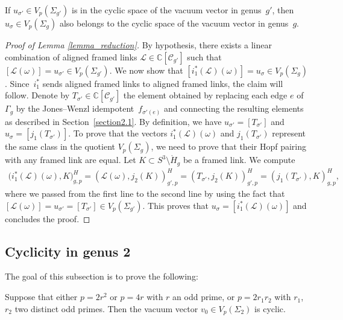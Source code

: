 \begin{Lemma}\label{lemma_reduction}If $u_{\sigma'}\in V_p(\Sigma_{g'})$ is in the cyclic space of the vacuum vector in genus~$g'$, then $u_{\sigma}\in V_p(\Sigma_g)$ also belongs to the cyclic space of the vacuum vector in genus~$g$.
\end{Lemma}

\begin{proof}[Proof of Lemma \ref{lemma_reduction}]
By hypothesis, there exists a linear combination of aligned framed links $\mathcal{L}\in \mathbb{C}[\mathcal{C}_{g'}]$ such that $[\mathcal{L}(\omega)]= u_{\sigma'} \in V_p(\Sigma_{g'})$. We now show that $[i_1^*(\mathcal{L})(\omega)]=u_{\sigma}\in V_p(\Sigma_g)$. Since~$i_1^*$ sends aligned framed links to aligned framed links, the claim will follow. Denote by \mbox{$T_{\sigma'}\in \mathbb{C}[\mathcal{C}_{g'}]$} the element obtained by replacing each edge $e$ of $\Gamma_g$ by the Jones--Wenzl idempotent~$f_{\sigma'(e)}$ and connecting the resulting elements as described in Section~\ref{section2.1}. By definition, we have $u_{\sigma'}=[T_{\sigma'}]$ and $u_{\sigma}=[j_1 ( T_{\sigma'})]$. To prove that the vectors $i_1^*(\mathcal{L})(\omega)$ and $j_1 ( T_{\sigma'})$ represent the same class in the quotient $V_p(\Sigma_g)$, we need to prove that their Hopf pairing with any framed link are equal. Let $K\subset S^3\setminus \mathring{H}_g$ be a framed link. We compute
\begin{gather*}
\big( i_1^*(\mathcal{L})(\omega), K \big)^H_{g, p} = ( \mathcal{L}(\omega), j_2(K) )^H_{g', p} = ( T_{\sigma'}, j_2(K) )^H_{g',p}= ( j_1(T_{\sigma'}), K )^H_{g,p},
\end{gather*}
where we passed from the first line to the second line by using the fact that $[\mathcal{L}(\omega)]=u_{\sigma'}= [T_{\sigma'}]\in V_p(\Sigma_{g'})$. This proves that $u_{\sigma}=[i_1^*(\mathcal{L})(\omega)]$ and concludes the proof.
\end{proof}

\subsection{Cyclicity in genus 2}
The goal of this subsection is to prove the following:
\begin{Proposition}\label{prop_cyclicity_high_genus}
Suppose that either $p=2r^2$ or $p=4r$ with $r$ an odd prime, or $p=2r_1r_2$ with $r_1$, $r_2$ two distinct odd primes. Then the vacuum vector $v_0\in V_p(\Sigma_2)$ is cyclic.
\end{Proposition}

